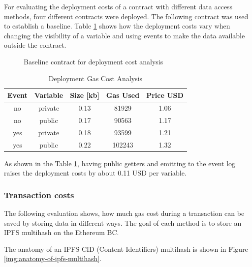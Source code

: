 For evaluating the deployment costs of a contract with different data access methods, four different contracts were deployed. The following contract was used to establish a baseline. Table \ref{tab:deployment-gas-cost-analysis} shows how the deployment costs vary when changing the visibility of a variable and using events to make the data available outside the contract.

\begin{figure}[H]
    
    \caption{Baseline contract for deployment cost analysis}
    \label{code:ipfs-storage}
\end{figure}

\begin{table}[ht]
\centering
\begin{tabular}{|c|c|c|c|c|}
\hline
\textbf{Event} & \textbf{Variable} & \textbf{Size {[}kb{]}} & \textbf{Gas Used} & \textbf{Price USD} \\ \hline
no             & private           & 0.13                   & 81929             & 1.06               \\ \hline
no             & public            & 0.17                   & 90563             & 1.17               \\ \hline
yes            & private           & 0.18                   & 93599             & 1.21               \\ \hline
yes            & public            & 0.22                   & 102243            & 1.32               \\ \hline
\end{tabular}
\caption{Deployment Gas Cost Analysis}
\label{tab:deployment-gas-cost-analysis}
\end{table}

As shown in the Table \ref{tab:deployment-gas-cost-analysis}, having public getters and emitting to the event log raises the deployment costs by about 0.11 USD per variable. 


\subsubsection{Transaction costs}\label{sec:tx-costs-evaluation}
The following evaluation shows, how much gas cost during a transaction can be saved by storing data in different ways. The goal of each method is to store an IPFS multihash on the Ethereum BC.

The anatomy of an IPFS CID (Content Identifiers) multihash is shown in Figure \ref{img:anatomy-of-ipfs-multihash}. 


